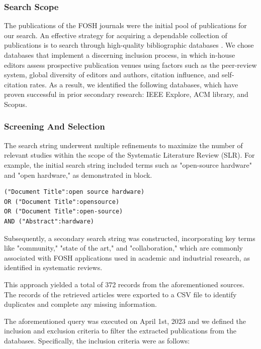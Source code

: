\documentclass[final-report.tex]{subfiles}
\begin{document}
\subsubsection{Search Scope}

The publications of the FOSH journals were the initial pool of publications for our search. An effective strategy for acquiring a dependable collection of publications is to search through high-quality bibliographic databases \cite{petersen2015guidelines}. We chose databases that implement a discerning inclusion process, in which in-house editors assess prospective publication venues using factors such as the peer-review system, global diversity of editors and authors, citation influence, and self-citation rates. As a result, we identified the following databases, which have proven successful in prior secondary research: IEEE Explore, ACM library, and Scopus.

\subsubsection{Screening And Selection}
The search string underwent multiple refinements to maximize the number of relevant studies within the scope of the Systematic Literature Review (SLR). For example, the initial search string included terms such as "open-source hardware" and "open hardware," as demonstrated in block. 
\par
\begin{lstlisting}
("Document Title":open source hardware)
OR ("Document Title":opensource)
OR ("Document Title":open-source)
AND ("Abstract":hardware)
\end{lstlisting}
Subsequently, a secondary search string was constructed, incorporating key terms like "community," "state of the art," and "collaboration," which are commonly associated with FOSH applications used in academic and industrial research, as identified in systematic reviews.

This approach yielded a total of 372 records from the aforementioned sources. The records of the retrieved articles were exported to a CSV file to identify duplicates and complete any missing information.

The aforementioned query was executed on April 1st, 2023 and we defined the inclusion and exclusion criteria to filter the extracted publications from the databases. Specifically, the inclusion criteria were as follows:
\end{document}
